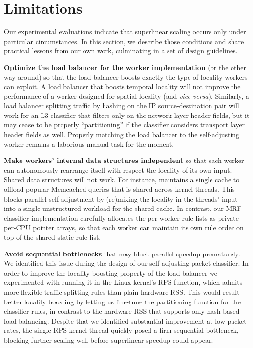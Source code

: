 \section{Limitations}
\label{sec:discussion}

Our experimental evaluations indicate that superlinear scaling occurs only under particular circumstances. In this section, we describe those conditions and share practical lessons from our own work, culminating in a set of design guidelines.

\noindent%
\textbf{Optimize the load balancer for the worker implementation} (or the other way around) so that the load balancer boosts exactly the type of locality workers can exploit. A load balancer that boosts temporal locality will not improve the performance of a worker designed for spatial locality (and \emph{vice versa}). Similarly, a load balancer splitting traffic by hashing on the IP source-destination pair will work for an L3 classifier that filters only on the network layer header fields, but it may cease to be properly ``partitioning'' if the classifier considers transport layer header fields as well. Properly matching the load balancer to the self-adjusting worker remains a laborious manual task for the moment.

\noindent%
\textbf{Make workers' internal data structures independent} so that each worker can autonomously rearrange itself with respect the locality of its own input. Shared data structures will not work. For instance, \cite{ghigoff2021bmc} maintains a single cache to offload popular Memcached queries that is shared across kernel threads. This blocks parallel self-adjustment by (re)mixing the locality in the threads' input into a single unstructured workload for the shared cache. In contrast, our MRF classifier implementation carefully allocates the per-worker rule-lists as private per-CPU pointer arrays, so that each worker can maintain its own rule order on top of the shared static rule list.

\noindent%
\textbf{Avoid sequential bottlenecks} that may block parallel speedup prematurely. We identified this issue during the design of our self-adjusting packet classifier. In order to improve the locality-boosting property of the load balancer we experimented with running it in the Linux kernel's RPS function, which admits more flexible traffic splitting rules than plain hardware RSS. This would result better locality boosting by letting us fine-tune the partitioning function for the classifier rules, in contrast to the hardware RSS that supports only hash-based load balancing. Despite that we identified substantial improvement at low packet rates, the single RPS kernel thread quickly posed a firm sequential bottleneck, blocking further scaling well before superlinear speedup could appear.

